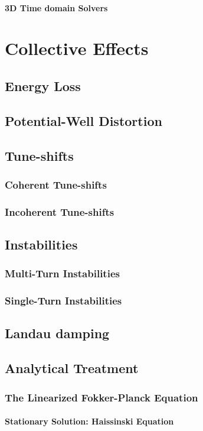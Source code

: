 \documentclass[
	12pt,				%
	openright,			%
	oneside,			%
	a4paper,		%
	chapter=TITLE,		%
	section=TITLE,		%
    brazil,				%
	english,			%
	sumario=tradicional,
	]{abntex2}
\begin{document}
      \subsubsection{3D Time domain Solvers}

\chapter{Collective Effects}
  \section{Energy Loss}
  \section{Potential-Well Distortion}
  \section{Tune-shifts}
    \subsection{Coherent Tune-shifts}
    \subsection{Incoherent Tune-shifts}
  \section{Instabilities}
    \subsection{Multi-Turn Instabilities}
    \subsection{Single-Turn Instabilities}
  \section{Landau damping}
  \section{Analytical Treatment}
    \subsection{The Linearized Fokker-Planck Equation}
      \subsubsection{Stationary Solution: Haissinski Equation}
\end{document}
